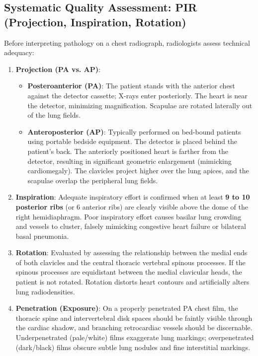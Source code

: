 \documentclass[11pt,a4paper]{article}
\begin{document}
\subsection{Systematic Quality Assessment: PIR (Projection, Inspiration, Rotation)}
Before interpreting pathology on a chest radiograph, radiologists assess technical adequacy:
\begin{enumerate}[leftmargin=*]
    \item \textbf{Projection (PA vs. AP)}:
    \begin{itemize}
        \item \textbf{Posteroanterior (PA)}: The patient stands with the anterior chest against the detector cassette; X-rays enter posteriorly. The heart is near the detector, minimizing magnification. Scapulae are rotated laterally out of the lung fields.
        \item \textbf{Anteroposterior (AP)}: Typically performed on bed-bound patients using portable bedside equipment. The detector is placed behind the patient's back. The anteriorly positioned heart is farther from the detector, resulting in significant geometric enlargement (mimicking cardiomegaly). The clavicles project higher over the lung apices, and the scapulae overlap the peripheral lung fields.
    \end{itemize}
    \item \textbf{Inspiration}: Adequate inspiratory effort is confirmed when at least \textbf{9 to 10 posterior ribs} (or 6 anterior ribs) are clearly visible above the dome of the right hemidiaphragm. Poor inspiratory effort causes basilar lung crowding and vessels to cluster, falsely mimicking congestive heart failure or bilateral basal pneumonia.
    \item \textbf{Rotation}: Evaluated by assessing the relationship between the medial ends of both clavicles and the central thoracic vertebral spinous processes. If the spinous processes are equidistant between the medial clavicular heads, the patient is not rotated. Rotation distorts heart contours and artificially alters lung radiodensities.
    \item \textbf{Penetration (Exposure)}: On a properly penetrated PA chest film, the thoracic spine and intervertebral disk spaces should be faintly visible through the cardiac shadow, and branching retrocardiac vessels should be discernable. Underpenetrated (pale/white) films exaggerate lung markings; overpenetrated (dark/black) films obscure subtle lung nodules and fine interstitial markings.
\end{enumerate}
\end{document}
